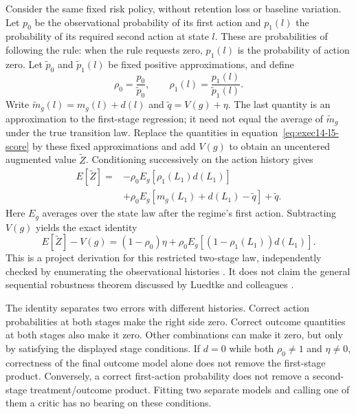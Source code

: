 Consider the same fixed risk policy, without retention loss or baseline
variation. Let $p_0$ be the observational probability of its first action and
$p_1(l)$ the probability of its required second action at state $l$. These are
probabilities of following the rule: when the rule requests zero, $p_1(l)$ is
the probability of action zero. Let $\widetilde p_0$ and
$\widetilde p_1(l)$ be fixed positive approximations, and define
\[
 \rho_0=\frac{p_0}{\widetilde p_0},\qquad
 \rho_1(l)=\frac{p_1(l)}{\widetilde p_1(l)}.
\]
Write $\widetilde m_g(l)=m_g(l)+d(l)$ and
$\widetilde q=V(g)+\eta$. The last quantity is an approximation to the
first-stage regression; it need not equal the average of
$\widetilde m_g$ under the true transition law. Replace the quantities in
equation~\eqref{eq:exec14-l5-score} by these fixed approximations and add
$V(g)$ to obtain an uncentered augmented value $\widetilde Z$. Conditioning
successively on the action history gives
\begin{align*}
 E[\widetilde Z]
 ={}&-\rho_0E_g[\rho_1(L_1)d(L_1)]\\
 &+\rho_0E_g[m_g(L_1)+d(L_1)-\widetilde q]
   +\widetilde q.
\end{align*}
Here $E_g$ averages over the state law after the regime's first action.
Subtracting $V(g)$ yields the exact identity
\begin{equation}
 E[\widetilde Z]-V(g)
 =(1-\rho_0)\eta
   +\rho_0E_g[(1-\rho_1(L_1))d(L_1)].
 \label{eq:exec14-l5-remainder}
\end{equation}
This is a project derivation for this restricted two-stage law, independently
checked by enumerating the observational histories
\citep{exec14_workflow_remainder}. It does not claim the general sequential
robustness theorem discussed by Luedtke and colleagues
\citep{sequentialdr2018}.

The identity separates two errors with different histories. Correct action
probabilities at both stages make the right side zero. Correct outcome
quantities at both stages also make it zero. Other combinations can make it
zero, but only by satisfying the displayed stage conditions. If $d=0$ while
both $\rho_0\neq1$ and $\eta\neq0$, correctness of the final outcome model
alone does not remove the first-stage product. Conversely, a correct
first-action probability does not remove a second-stage treatment/outcome
product. Fitting two separate models and calling one of them a critic has no
bearing on these conditions.

